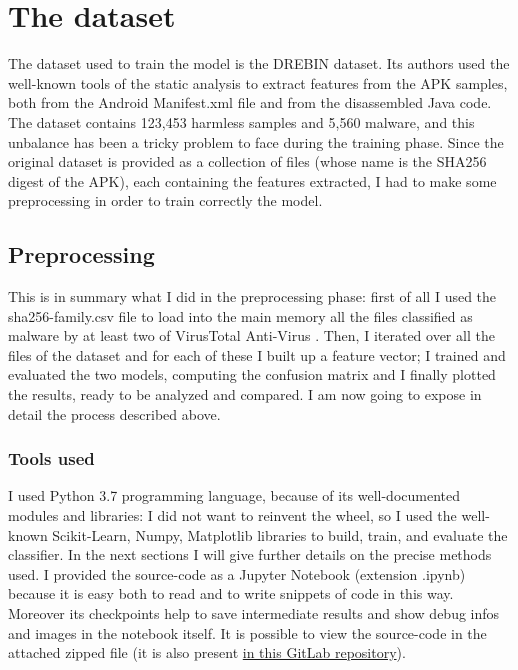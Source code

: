\documentclass[12pt]{article}
\begin{document}
\section{The dataset}
\label{sec:dataset}
The dataset used to train the model is the DREBIN dataset. Its authors used the well-known tools of the static analysis to extract features from the APK samples, both from the Android Manifest.xml file and from the disassembled Java code. The dataset contains 123,453 harmless samples and 5,560 malware, and this unbalance has been a tricky problem to face during the training phase. Since the original dataset is provided as a collection of files (whose name is the SHA256 digest of the APK), each containing the features extracted, I had to make some preprocessing in order to train correctly the model. 

\subsection{Preprocessing}
This is in summary what I did in the preprocessing phase: first of all I used the sha256-family.csv file to load into the main memory all the files classified as malware by at least two of VirusTotal Anti-Virus \cite{DREBIN}. Then, I iterated over all the files of the dataset and for each of these I built up a feature vector; I trained and evaluated the two models, computing the confusion matrix and I finally plotted the results, ready to be analyzed and compared. I am now going to expose in detail the process described above. 

\subsubsection{Tools used}
I used Python 3.7 programming language, because of its well-documented modules and libraries: I did not want to reinvent the wheel, so I used the well-known Scikit-Learn, Numpy, Matplotlib libraries to build, train, and evaluate the classifier. In the next sections I will give further details on the precise methods used.
I provided the source-code as a Jupyter Notebook (extension .ipynb) because it is easy both to read and to write snippets of code in this way. Moreover its checkpoints help to save intermediate results and show debug infos and images in the notebook itself. It is possible to view the source-code in the attached zipped file (it is also present \href{https://www.gitlab.com/lrusso96/machine-learning}{in this GitLab repository}).
\end{document}
